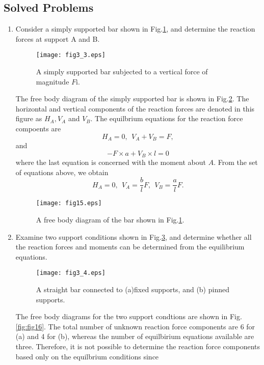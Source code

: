 \documentclass[10pt,a4j]{article}
\begin{document}
\subsection{Solved Problems}
\begin{enumerate}
\item
Consider a simply supported bar shown in Fig.\ref{fig:fig3_3}, and 
determine the reaction forces at support A and B.
\begin{figure}[h]
	\begin{center}
	\texttt{[image: fig3\_3.eps]} 
	\end{center}
	\caption{A simply supported bar subjected to a vertical force of magnitude $F$i.}
	\label{fig:fig3_3}
\end{figure}
{\small
	The free body diagram of the simply supported bar is shown in Fig.\ref{fig:fig15}. 
	The horizontal and vertical components of the reaction forces are denoted in
	this figure as $H_A, V_A$ and $V_B$.
	The equilbrium equations for the reaction force compoents are 
	\[
		H_A=0, \ \ V_A+V_B=F, 
	\]
	and 
	\[
		-F\times a +V_B\times l =0
	\]
	where the last equation is concerned with the moment about $A$.
	From the set of equations above, we obtain
	\[
		H_A=0, \ \ V_A=\frac{b}{l}F, \ \ V_B=\frac{a}{l}F.
	\]
}
	\begin{figure}[h]
	\begin{center}
	\texttt{[image: fig15.eps]} 
	\end{center}
	\caption{A free body diagram of the bar shown in Fig.\ref{fig:fig3_3}.} 
	\label{fig:fig15}
	\end{figure}
\item
Examine two support conditions shown in Fig.\ref{fig:fig3_4}, 
and determine whether all the reaction forces and moments can 
be determined from the equilibrium equations. 
\begin{figure}[h]
	\begin{center}
	\texttt{[image: fig3\_4.eps]} 
	\end{center}
	\caption{A straight bar connected to (a)fixed supports, and (b) pinned supports.} 
	\label{fig:fig3_4}
\end{figure}
{\small
	The free body diagrams for the two support condtions are shown in 
	Fig.\ref{fig:fig16}. The total number of unknown reaction force components are  
	6 for (a) and 4 for (b), whereas the number of equilbirium equations 
	available are three. Therefore, it is not possible to determine the 
	reaction force components based only on the equilbrium conditions since 
}
\end{enumerate}
\end{document}
